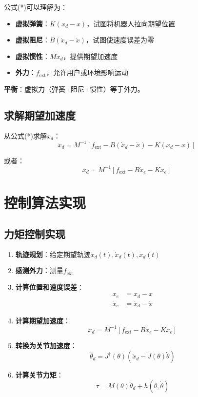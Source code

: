 \documentclass[12pt,a4paper]{article}
\begin{document}
公式(*)可以理解为：
\begin{itemize}
\item \textbf{虚拟弹簧}：$K(x_d - x)$，试图将机器人拉向期望位置
\item \textbf{虚拟阻尼}：$B(\dot{x}_d - \dot{x})$，试图使速度误差为零
\item \textbf{虚拟惯性}：$M\ddot{x}_d$，提供期望加速度
\item \textbf{外力}：$f_{\text{ext}}$，允许用户或环境影响运动
\end{itemize}

\textbf{平衡}：虚拟力（弹簧+阻尼+惯性）等于外力。

\subsection{求解期望加速度}

从公式(*)求解$\ddot{x}_d$：
\begin{equation}
\ddot{x}_d = M^{-1}[f_{\text{ext}} - B(\dot{x}_d - \dot{x}) - K(x_d - x)]
\end{equation}

或者：
\begin{equation}
\ddot{x}_d = M^{-1}[f_{\text{ext}} - B\dot{x}_e - Kx_e]
\end{equation}

\section{控制算法实现}

\subsection{力矩控制实现}

\begin{enumerate}
\item \textbf{轨迹规划}：给定期望轨迹$x_d(t), \dot{x}_d(t), \ddot{x}_d(t)$
\item \textbf{感测外力}：测量$f_{\text{ext}}$
\item \textbf{计算位置和速度误差}：
\begin{align}
x_e &= x_d - x \\
\dot{x}_e &= \dot{x}_d - \dot{x}
\end{align}
\item \textbf{计算期望加速度}：
\begin{equation}
\ddot{x}_d = M^{-1}[f_{\text{ext}} - B\dot{x}_e - Kx_e]
\end{equation}
\item \textbf{转换为关节加速度}：
\begin{equation}
\ddot{\theta}_d = J^{\dagger}(\theta)(\ddot{x}_d - \dot{J}(\theta)\dot{\theta})
\end{equation}
\item \textbf{计算关节力矩}：
\begin{equation}
\tau = M(\theta)\ddot{\theta}_d + h(\theta, \dot{\theta})
\end{equation}
\end{enumerate}
\end{document}

